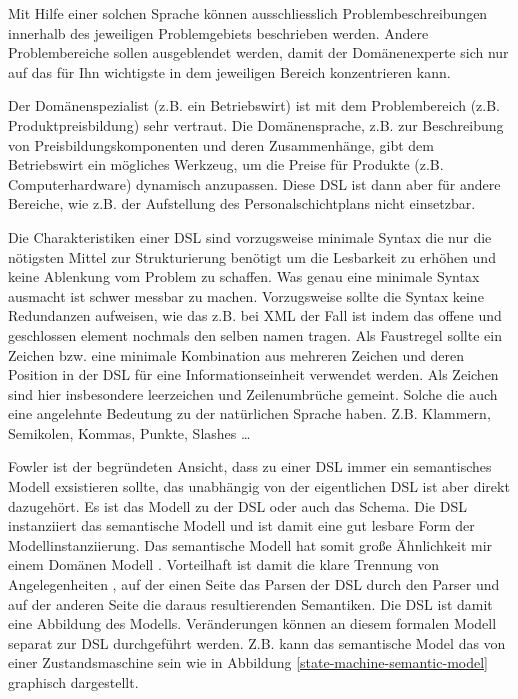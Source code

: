 \documentclass[11pt,english,ngerman, headsepline]{scrreprt}
\begin{document}
Mit Hilfe einer solchen Sprache können ausschliesslich Problembeschreibungen
innerhalb des jeweiligen Problemgebiets beschrieben werden.
Andere Problembereiche sollen ausgeblendet werden, damit der Domänenexperte sich
nur auf das für Ihn wichtigste in dem jeweiligen Bereich konzentrieren kann.

Der Domänenspezialist (z.B. ein Betriebswirt) ist mit dem Problembereich (z.B.
Produktpreisbildung) sehr vertraut. Die Domänensprache, z.B. zur Beschreibung
von Preisbildungskomponenten und deren Zusammenhänge, gibt dem Betriebswirt ein
mögliches Werkzeug, um die Preise für Produkte (z.B. Computerhardware) dynamisch
anzupassen. Diese DSL ist dann aber für andere Bereiche, wie z.B.
der Aufstellung des Personalschichtplans nicht einsetzbar.

Die Charakteristiken einer DSL sind vorzugsweise minimale Syntax die nur die
nötigsten Mittel zur Strukturierung benötigt um die Lesbarkeit zu erhöhen und
keine Ablenkung vom Problem zu schaffen. 
Was genau eine minimale Syntax ausmacht ist schwer messbar zu machen.
Vorzugsweise sollte die Syntax keine Redundanzen aufweisen, wie das z.B. bei
XML der Fall ist indem das offene und geschlossen element nochmals den selben
namen tragen. Als Faustregel sollte ein Zeichen bzw. eine minimale Kombination
aus mehreren Zeichen und deren Position in der DSL für eine Informationseinheit
verwendet werden. Als Zeichen sind hier insbesondere leerzeichen und
Zeilenumbrüche gemeint. Solche die auch eine angelehnte Bedeutung zu der
natürlichen Sprache haben. Z.B. Klammern, Semikolen, Kommas, Punkte, Slashes \ldots 

Fowler ist der begründeten Ansicht, dass zu einer DSL immer ein semantisches
Modell \cite[p. 159]{fowler2011domain} exsistieren sollte, das unabhängig von
der eigentlichen DSL ist aber direkt dazugehört. Es ist das Modell zu der DSL 
oder auch das Schema. Die DSL instanziiert das semantische Modell und ist damit
eine gut lesbare Form der Modellinstanziierung. Das semantische Modell hat somit
große Ähnlichkeit mir einem Domänen Modell \cite[]{fowler2003patterns}.
Vorteilhaft ist damit die klare Trennung von Angelegenheiten
\cite{Hürsch95separationof}, auf der einen Seite das Parsen der DSL durch den
Parser und auf der anderen Seite die daraus resultierenden Semantiken.
Die DSL ist damit eine Abbildung des Modells. Veränderungen können an diesem
formalen Modell separat zur DSL durchgeführt werden. Z.B. kann das semantische
Model das von einer Zustandsmaschine sein wie in Abbildung
\ref{state-machine-semantic-model} graphisch dargestellt.
\end{document}
